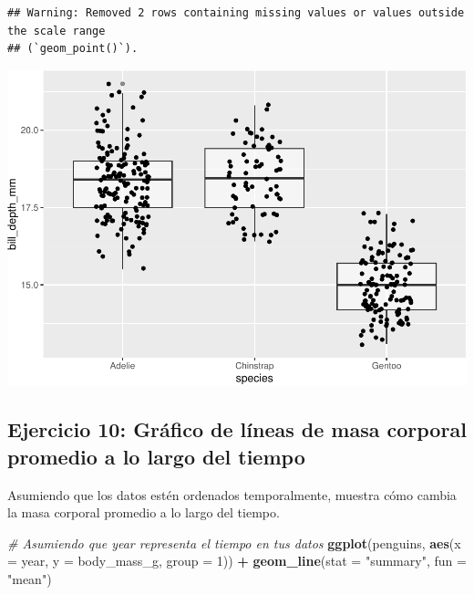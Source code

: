 \documentclass[
]{book}
\newenvironment{Shaded}{\begin{snugshade}}{\end{snugshade}}
\newcommand{\AttributeTok}[1]{\textcolor[rgb]{0.13,0.29,0.53}{#1}}
\newcommand{\CommentTok}[1]{\textcolor[rgb]{0.56,0.35,0.01}{\textit{#1}}}
\newcommand{\DecValTok}[1]{\textcolor[rgb]{0.00,0.00,0.81}{#1}}
\newcommand{\FunctionTok}[1]{\textcolor[rgb]{0.13,0.29,0.53}{\textbf{#1}}}
\newcommand{\NormalTok}[1]{#1}
\newcommand{\SpecialCharTok}[1]{\textcolor[rgb]{0.81,0.36,0.00}{\textbf{#1}}}
\newcommand{\StringTok}[1]{\textcolor[rgb]{0.31,0.60,0.02}{#1}}
\begin{document}
\begin{verbatim}
## Warning: Removed 2 rows containing missing values or values outside the scale range
## (`geom_point()`).
\end{verbatim}

\includegraphics{bookdown-demo_files/figure-latex/unnamed-chunk-208-1.pdf}

\hypertarget{ejercicio-10-gruxe1fico-de-luxedneas-de-masa-corporal-promedio-a-lo-largo-del-tiempo-1}{%
\subsection{Ejercicio 10: Gráfico de líneas de masa corporal promedio a lo largo del tiempo}\label{ejercicio-10-gruxe1fico-de-luxedneas-de-masa-corporal-promedio-a-lo-largo-del-tiempo-1}}

Asumiendo que los datos estén ordenados temporalmente, muestra cómo cambia la masa corporal promedio a lo largo del tiempo.

\begin{Shaded}
\begin{Highlighting}[]
\CommentTok{\# Asumiendo que \textquotesingle{}year\textquotesingle{} representa el tiempo en tus datos}
\FunctionTok{ggplot}\NormalTok{(penguins, }\FunctionTok{aes}\NormalTok{(}\AttributeTok{x =}\NormalTok{ year, }\AttributeTok{y =}\NormalTok{ body\_mass\_g, }\AttributeTok{group =} \DecValTok{1}\NormalTok{)) }\SpecialCharTok{+}
  \FunctionTok{geom\_line}\NormalTok{(}\AttributeTok{stat =} \StringTok{"summary"}\NormalTok{, }\AttributeTok{fun =} \StringTok{"mean"}\NormalTok{)}
\end{Highlighting}
\end{Shaded}
\end{document}
